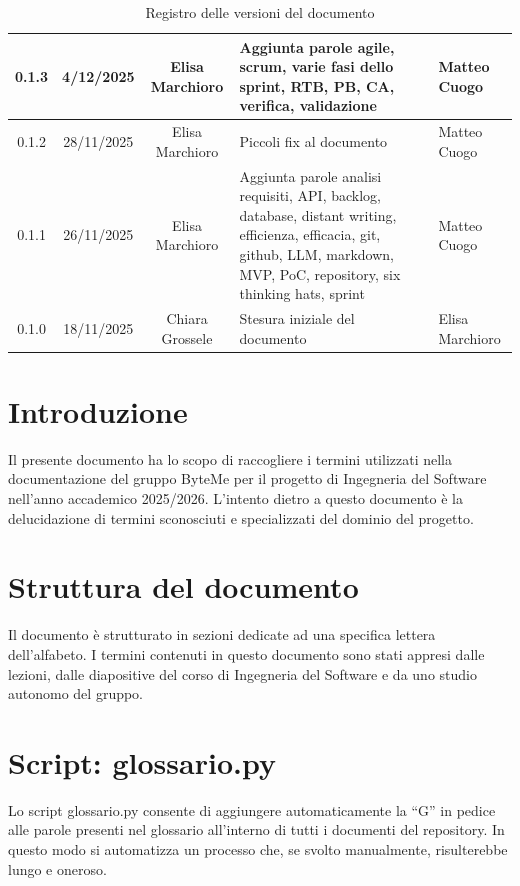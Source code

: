 \documentclass[11pt,a4paper]{article}
\begin{document}
\begin{table}[H]
\begin{tabular}{|c|c|c|>{\raggedright\arraybackslash}p{}|p{}|}
        \hline
        0.1.3 & 4/12/2025 & Elisa Marchioro & Aggiunta parole agile, scrum, varie fasi dello sprint, RTB, PB, CA, verifica, validazione & Matteo Cuogo\\
        \hline
        0.1.2 & 28/11/2025 & Elisa Marchioro & Piccoli fix al documento & Matteo Cuogo\\
        \hline
        0.1.1 & 26/11/2025 & Elisa Marchioro & Aggiunta parole analisi requisiti, API, backlog, database, distant writing, efficienza, efficacia, git, github, LLM, markdown, MVP, PoC, repository, six thinking hats, sprint & Matteo Cuogo\\
        \hline
        0.1.0 & 18/11/2025 & Chiara Grossele & Stesura iniziale del documento & Elisa Marchioro\\
        \hline
    \end{tabular}
    \caption{Registro delle versioni del documento}
    \label{tab:versionamento}
\end{table}

\newpage

\tableofcontents
\thispagestyle{empty}
\newpage
\setcounter{page}{1}

\section{Introduzione}
Il presente documento ha lo scopo di raccogliere i termini utilizzati nella documentazione del gruppo ByteMe per il progetto di Ingegneria del Software nell'anno accademico 2025/2026.
L'intento dietro a questo documento è la delucidazione di termini sconosciuti e specializzati del dominio del progetto.

\section{Struttura del documento}
Il documento è strutturato in sezioni dedicate ad una specifica lettera dell'alfabeto. I termini contenuti in questo documento sono stati appresi dalle lezioni, dalle diapositive del corso di Ingegneria del Software e da uno studio autonomo del gruppo.

\section{Script: glossario.py}
Lo script glossario.py consente di aggiungere automaticamente la “G” in pedice alle parole presenti nel glossario all’interno di tutti i documenti del repository. In questo modo si automatizza un processo che, se svolto manualmente, risulterebbe lungo e oneroso.
\newpage
\end{document}
